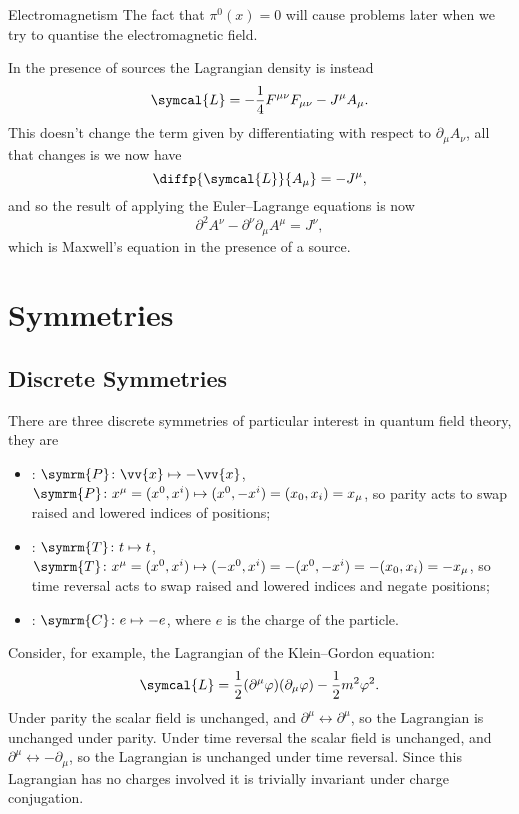 \documentclass[fleqn]{NotesClass}
\newcommand{\dalembertian}{\partial^2}
\newcommand{\lagrangianDensity}{\symcal{L}}
\newcommand{\parity}{\symrm{P}}
\newcommand{\chargeConjugation}{\symrm{C}}
\newcommand{\timeReversal}{\symrm{T}}
\begin{document}
\begin{exm}{Electromagnetism}{}
        The fact that \(\pi^0(x) = 0\) will cause problems later when we try to quantise the electromagnetic field.
        
        In the presence of sources the Lagrangian density is instead
        \begin{equation}
            \lagrangianDensity = -\frac{1}{4}F^{\mu\nu}F_{\mu\nu} - J^\mu A_\mu.
        \end{equation}
        This doesn't change the term given by differentiating with respect to \(\partial_\mu A_\nu\), all that changes is we now have
        \begin{equation}
            \diffp{\lagrangianDensity}{A_\mu} = -J^\mu,
        \end{equation}
        and so the result of applying the Euler--Lagrange equations is now
        \begin{equation}
            \dalembertian A^\nu - \partial^\nu \partial_\mu A^\mu = J^\nu,
        \end{equation}
        which is Maxwell's equation in the presence of a source.
    \end{exm}
    
    \section{Symmetries}
    \subsection{Discrete Symmetries}
    There are three discrete symmetries of particular interest in quantum field theory, they are
    \begin{itemize}
        \item {}: \(\parity \colon \vv{x} \mapsto -\vv{x}\), \(\parity \colon x^\mu = (x^0, x^i) \mapsto (x^0, -x^i) = (x_0, x_i) = x_\mu\), so parity acts to swap raised and lowered indices of positions;
        \item {}: \(\timeReversal \colon t \mapsto t\), \(\timeReversal \colon x^\mu = (x^0, x^i) \mapsto (-x^0, x^i) = -(x^0, -x^i) = -(x_0, x_i) = -x_\mu\), so time reversal acts to swap raised and lowered indices and negate positions;
        \item {}: \(\chargeConjugation \colon e \mapsto -e\), where \(e\) is the charge of the particle.
    \end{itemize}
    
    Consider, for example, the Lagrangian of the Klein--Gordon equation:
    \begin{equation}
        \lagrangianDensity = \frac{1}{2}(\partial^\mu \varphi)(\partial_\mu\varphi) - \frac{1}{2}m^2 \varphi^2.
    \end{equation}
    Under parity the scalar field is unchanged, and \(\partial^\mu \leftrightarrow \partial^\mu\), so the Lagrangian is unchanged under parity.
    Under time reversal the scalar field is unchanged, and \(\partial^\mu \leftrightarrow -\partial_\mu\), so the Lagrangian is unchanged under time reversal.
    Since this Lagrangian has no charges involved it is trivially invariant under charge conjugation.
    
\end{document}
